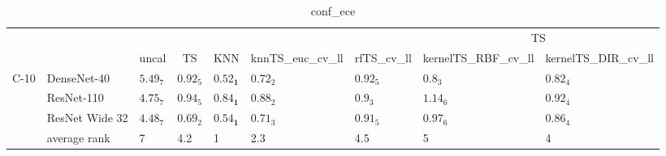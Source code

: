 \begin{table*}
\caption{conf_ece}
\label{table:conf_ece}
\centering
\begin{adjustbox}{width=\textwidth}

\begin{tabular}{lllllllll}
\toprule
\multicolumn{7}{c}{}&\multicolumn{2}{c}{TS}\\
\cmidrule{8-9}
\multicolumn{1}{c}{}&\multicolumn{1}{c}{}&\multicolumn{1}{c}{uncal}&\multicolumn{1}{c}{TS}&\multicolumn{1}{c}{KNN}&\multicolumn{1}{c}{knnTS_euc_cv_ll}&\multicolumn{1}{c}{rfTS_cv_ll}&\multicolumn{1}{c}{kernelTS_RBF_cv_ll}&\multicolumn{1}{c}{kernelTS_DIR_cv_ll}\\\midrule
C-10 & DenseNet-40 &  $5.49_{7}$ &  $0.92_{5}$ &  $\mathbf{0.52_{1}}$ &      $0.72_{2}$ &  $0.92_{5}$ &          $0.8_{3}$ &         $0.82_{4}$ \\
     & ResNet-110 &  $4.75_{7}$ &  $0.94_{5}$ &  $\mathbf{0.84_{1}}$ &      $0.88_{2}$ &   $0.9_{3}$ &         $1.14_{6}$ &         $0.92_{4}$ \\
     & ResNet Wide 32 &  $4.48_{7}$ &  $0.69_{2}$ &  $\mathbf{0.54_{1}}$ &      $0.71_{3}$ &  $0.91_{5}$ &         $0.97_{6}$ &         $0.86_{4}$ \\
\cmidrule{2-9}
     & average rank &           7 &         4.2 &                    1 &             2.3 &         4.5 &                  5 &                  4 \\
\cmidrule{1-9}
\bottomrule
\end{tabular}


\end{adjustbox}
\end{table*}